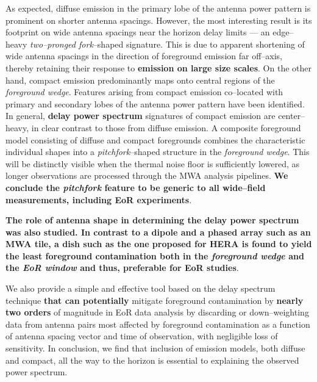 \documentclass[preprint2,iop,numberedappendix]{emulateapj}
\begin{document}
As expected, diffuse emission in the primary lobe of the antenna power pattern is prominent on shorter antenna spacings. However, the most interesting result is its footprint on wide antenna spacings near the horizon delay limits --- an edge--heavy {\it two--pronged fork}--shaped signature. This is due to apparent shortening of wide antenna spacings in the direction of foreground emission far off--axis, thereby retaining their response to {\bf emission on large size scales}. On the other hand, compact emission predominantly maps onto central regions of the {\it foreground wedge}. Features arising from compact emission co--located with primary and secondary lobes of the antenna power pattern have been identified. In general, {\bf delay power spectrum} signatures of compact emission are center--heavy, in clear contrast to those from diffuse emission. A composite foreground model consisting of diffuse and compact foregrounds combines the characteristic individual shapes into a {\it pitchfork}--shaped structure in the {\it foreground wedge}. This will be distinctly visible when the thermal noise floor is sufficiently lowered, as longer observations are processed through the MWA analysis pipelines. {\bf We conclude the {\it pitchfork} feature to be generic to all wide--field measurements, including EoR experiments}. 

{\bf The role of antenna shape in determining the {\bf delay power spectrum} was also studied. In contrast to a dipole and a phased array such as an MWA tile, a dish such as the one proposed for HERA is found to yield the least foreground contamination both in the {\it foreground wedge} and the {\it EoR window} and thus, preferable for EoR studies}.

We also provide a simple and effective tool based on the delay spectrum technique {\bf that can potentially} mitigate foreground contamination by {\bf nearly two orders} of magnitude in EoR data analysis by discarding or down--weighting data from antenna pairs most affected by foreground contamination as a function of antenna spacing vector and time of observation, with negligible loss of sensitivity. In conclusion, we find that inclusion of emission models, both diffuse and compact, all the way to the horizon is essential to explaining the observed power spectrum. 

\acknowledgments
\end{document}
